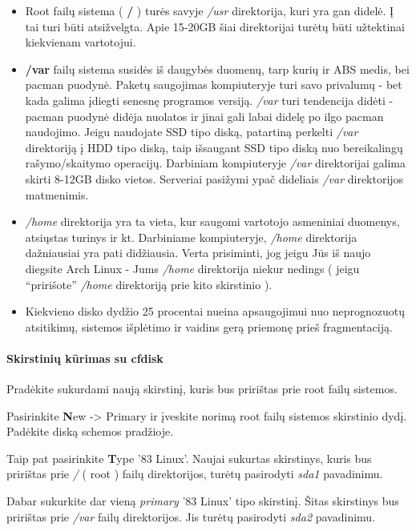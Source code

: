 \begin{itemize}
  \item Root failų sistema ( \textbf{/} ) turės savyje \textsl{/usr}
    direktorija, kuri yra gan didelė. Į tai turi būti
    atsižvelgta. Apie 15-20GB šiai direktorijai turėtų būti užtektinai
    kiekvienam vartotojui.
  \item \textbf{/var} failų sistema susidės iš daugybės duomenų, tarp
    kurių ir ABS medis, bei pacman puodynė. Paketų saugojimas
    kompiuteryje turi savo privalumų - bet kada galima įdiegti senesnę
    programos versiją. \textsl{/var} turi tendencija didėti - pacman
    puodynė didėja nuolatos ir jinai gali labai didelę po ilgo pacman
    naudojimo. Jeigu naudojate SSD tipo diską, patartiną perkelti
    \textsl{/var} direktoriją į HDD tipo diską, taip išsaugant SSD
    tipo diską nuo bereikalingų rašymo/skaitymo operacijų. Darbiniam
    kompiuteryje \textsl{/var} direktorijai galima skirti 8-12GB disko
    vietos. Serveriai pasižymi ypač dideliais \textsl{/var}
    direktorijos matmenimis.
  \item \textsl{/home} direktorija yra ta vieta, kur saugomi vartotojo
    asmeniniai duomenys, atsiųstas turinys ir kt. Darbiniame
    kompiuteryje, \textsl{/home} direktorija dažniausiai yra pati
    didžiausia. Verta prisiminti, jog jeigu Jūs iš naujo diegsite Arch
    Linux - Jums \textsl{/home} direktorija niekur nedings ( jeigu
    ``pririšote'' \textsl{/home} direktoriją prie kito skirstinio ).
  \item Kiekvieno disko dydžio 25 procentai nueina apsaugojimui nuo
    neprognozuotų atsitikimų, sistemos išplėtimo ir vaidins gerą
    priemonę prieš fragmentaciją.
\end{itemize}

\paragraph{Skirstinių kūrimas su cfdisk}

Pradėkite sukurdami naują skirstinį, kuris bus pririštas prie root
failų sistemos.

Pasirinkite \textbf{N}ew -> Primary ir įveskite norimą root failų
sistemos skirstinio dydį. Padėkite diską schemos pradžioje.

Taip pat pasirinkite \textbf{T}ype '83 Linux'. Naujai sukurtas
skirstinys, kuris bus pririštas prie \textsl{/} ( root ) failų
direktorijos, turėtų pasirodyti \textsl{sda1} pavadinimu.

Dabar sukurkite dar vieną \textsl{primary} '83 Linux' tipo
skirstinį. Šitas skirstinys bus pririštas prie \textsl{/var} failų
direktorijos. Jis turėtų pasirodyti \textsl{sda2} pavadinimu.

